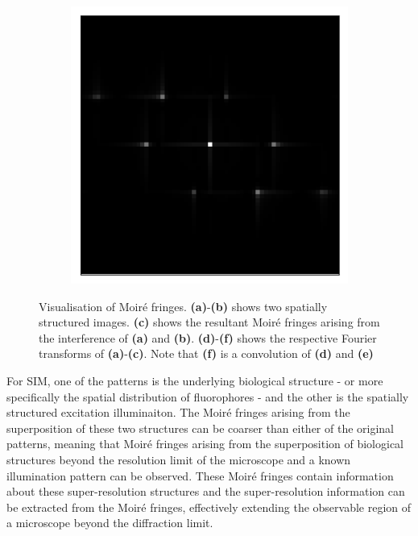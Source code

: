 \begin{figure}[h]
\begin{subfigure}[t]{0.3\textwidth}
		\caption{}
		\label{fig:fringes_2_ft}
	\end{subfigure}
	\begin{subfigure}[t]{0.3\textwidth}
		\centering
		\includegraphics[width=\linewidth]{images/fringes_moire_ft_kx_16_and_12_ky_0_and_12.png}
		\caption{}
		\label{fig:fringes_moire_ft}
	\end{subfigure}
	\caption[Visualisation of Moir\'{e} fringes]{Visualisation of Moir\'{e} 
		fringes. \textbf{(a)}-\textbf{(b)} shows two spatially structured images. 
		\textbf{(c)} shows the resultant Moir\'{e} fringes arising from the 
		interference of \textbf{(a)} and \textbf{(b)}. \textbf{(d)}-\textbf{(f)} 
		shows the respective Fourier transforms of \textbf{(a)}-\textbf{(c)}. 
		Note that \textbf{(f)} is a convolution of \textbf{(d)} and \textbf{(e)}}
	\label{fig:moire_visualisation}
\end{figure}

For SIM, one of the patterns is the underlying biological structure - or more 
specifically the spatial distribution of fluorophores - and the other is the 
spatially structured excitation illuminaiton. The Moir\'{e} fringes arising 
from the superposition of these two structures can be coarser than either of 
the original patterns, meaning that Moir\'{e} fringes arising from the 
superposition of biological structures beyond the resolution limit of the 
microscope and a known illumination pattern can be observed. These Moir\'{e} 
fringes contain information about these super-resolution structures and the
super-resolution information can be extracted from the Moir\'{e} fringes, 
effectively extending the observable region of a microscope beyond the 
diffraction limit\cite{gustafsson2000surpassing}.

